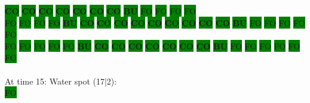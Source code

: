\colorbox{green}{\color[rgb]{0,0,0}\textbf{CO}}%
\colorbox{green}{\color[rgb]{0,0,0}\textbf{CO}}%
\colorbox{green}{\color[rgb]{0,0,0}\textbf{CO}}%
\colorbox{green}{\color[rgb]{0,0,0}\textbf{CO}}%
\colorbox{green}{\color[rgb]{0,0,0}\textbf{CO}}%
\colorbox{green}{\color[rgb]{0,0,0}\textbf{CO}}%
\colorbox{green}{\color[rgb]{0,0,0}\textbf{CO}}%
\colorbox{green}{\color[rgb]{1,0,0}\textbf{BU}}%
\colorbox{green}{\color[gray]{0.75}FO}%
\colorbox{green}{\color[gray]{0.75}FO}%
\colorbox{green}{\color[gray]{0.75}FO}%
\colorbox{green}{\color[gray]{0.75}FO}%
\\
\colorbox{green}{\color[gray]{0.75}FO}%
\colorbox{green}{\color[gray]{0.75}FO}%
\colorbox{green}{\color[gray]{0.75}FO}%
\colorbox{green}{\color[gray]{0.75}FO}%
\colorbox{green}{\color[rgb]{1,0,0}\textbf{BU}}%
\colorbox{green}{\color[rgb]{0,0,0}\textbf{CO}}%
\colorbox{green}{\color[rgb]{0,0,0}\textbf{CO}}%
\colorbox{green}{\color[rgb]{0,0,0}\textbf{CO}}%
\colorbox{green}{\color[rgb]{0,0,0}\textbf{CO}}%
\colorbox{green}{\color[rgb]{0,0,0}\textbf{CO}}%
\colorbox{green}{\color[rgb]{0,0,0}\textbf{CO}}%
\colorbox{green}{\color[rgb]{0,0,0}\textbf{CO}}%
\colorbox{green}{\color[rgb]{0,0,0}\textbf{CO}}%
\colorbox{green}{\color[rgb]{0,0,0}\textbf{CO}}%
\colorbox{green}{\color[rgb]{1,0,0}\textbf{BU}}%
\colorbox{green}{\color[gray]{0.75}FO}%
\colorbox{green}{\color[gray]{0.75}FO}%
\colorbox{green}{\color[gray]{0.75}FO}%
\colorbox{green}{\color[gray]{0.75}FO}%
\colorbox{green}{\color[gray]{0.75}FO}%
\\
\colorbox{green}{\color[gray]{0.75}FO}%
\colorbox{green}{\color[gray]{0.75}FO}%
\colorbox{green}{\color[gray]{0.75}FO}%
\colorbox{green}{\color[gray]{0.75}FO}%
\colorbox{green}{\color[gray]{0.75}FO}%
\colorbox{green}{\color[rgb]{1,0,0}\textbf{BU}}%
\colorbox{green}{\color[rgb]{0,0,0}\textbf{CO}}%
\colorbox{green}{\color[rgb]{0,0,0}\textbf{CO}}%
\colorbox{green}{\color[rgb]{0,0,0}\textbf{CO}}%
\colorbox{green}{\color[rgb]{0,0,0}\textbf{CO}}%
\colorbox{green}{\color[rgb]{0,0,0}\textbf{CO}}%
\colorbox{green}{\color[rgb]{0,0,0}\textbf{CO}}%
\colorbox{green}{\color[rgb]{0,0,0}\textbf{CO}}%
\colorbox{green}{\color[rgb]{1,0,0}\textbf{BU}}%
\colorbox{green}{\color[gray]{0.75}FO}%
\colorbox{green}{\color[gray]{0.75}FO}%
\colorbox{green}{\color[gray]{0.75}FO}%
\colorbox{green}{\color[gray]{0.75}FO}%
\colorbox{green}{\color[gray]{0.75}FO}%
\colorbox{green}{\color[gray]{0.75}FO}%
\\
\\
At time 15: Water spot (17|2):
\\
\colorbox{green}{\color[gray]{0.75}FO}%
